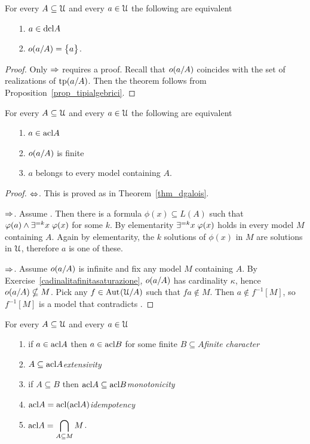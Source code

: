 \begin{theorem}\label{thm_dgalois}
For every $A\subseteq\EuScript U$ and every $a\in\EuScript U$ the following are equivalent
\begin{itemize}
\item[1.] $a\in{\rm dcl} A$
\item[2.] $o(a/A)=\big\{a\big\}$.
\end{itemize}
\end{theorem}

\begin{proof} 
Only $\Rightarrow$ requires a proof.
Recall that $o(a/A)$ coincides with the set of realizations of ${\rm tp}(a/A)$. 
Then the theorem follows from Proposition~\ref{prop_tipialgebrici}.
\end{proof}

\begin{theorem}\label{thm_fmgalois}
For every $A\subseteq\EuScript U$ and every $a\in\EuScript U$ the following are equivalent
\begin{itemize}
\item[1.] $a\in{\rm acl} A$
\item[2.] $o(a/A)$ is finite
\item[3.] $a$ belongs to every model containing $A$.
\end{itemize}
\end{theorem}

\begin{proof} $\Leftrightarrow$.
This is proved as in Theorem~\ref{thm_dgalois}.

$\Rightarrow$.
Assume .
Then there is a formula $\phi(x)\subseteq L(A)$ such that $\varphi(a)\wedge\exists^{=k}x\;\varphi(x)$ for some $k$.
By elementarity $\exists^{=k}x\;\varphi(x)$ holds in every model $M$ containing $A$.
Again by elementarity, the $k$ solutions of $\phi(x)$ in $M$ are solutions in $\EuScript U$, therefore $a$ is one of these.

$\Rightarrow$.
Assume $o(a/A)$ is infinite and fix any model $M$ containing $A$.
By Exercise~\ref{cadinalitafinitasaturazione}, $o(a/A)$  has cardinality $\kappa$, hence $o(a/A)\nsubseteq M$.
Pick any $f\in{\rm Aut\kern.15ex}(\EuScript U/A)$ such that $fa\notin M$.
Then $a\notin f^{-1}[M]$, so $f^{-1}[M]$ is a model that contradicts .
\end{proof}

\begin{corollary}\label{fmacl123} 
For every $A\subseteq\EuScript U$ and every $a\in\EuScript U$
\begin{itemize}
\item[1.]  if $a\in{\rm acl} A$ then $a\in{\rm acl} B$ for some finite $B\subseteq A$\hfill\emph{finite character}
\item[2.]  $A\subseteq {\rm acl} A$\hfill\emph{extensivity}
\item[3.]  if $A\subseteq B$ then ${\rm acl} A\subseteq {\rm acl} B$\hfill\emph{monotonicity}
\item[4.]  ${\rm acl} A={\rm acl}({\rm acl} A)$\hfill\emph{idempotency}
\item[5.]  $\displaystyle{\rm acl} A=\bigcap_{A\subseteq M}M$.
\end{itemize} 
\end{corollary}

